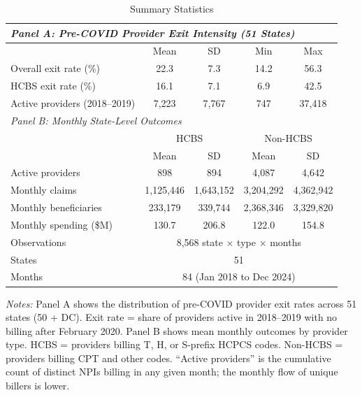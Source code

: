 \begin{table}[t]
\centering
\caption{Summary Statistics}
\label{tab:summary}
\begin{tabular}{lcccc}
\toprule
\multicolumn{5}{l}{\textit{Panel A: Pre-COVID Provider Exit Intensity (51 States)}} \\
\midrule
 & Mean & SD & Min & Max \\
Overall exit rate (\%) & 22.3 & 7.3 & 14.2 & 56.3 \\
HCBS exit rate (\%) & 16.1 & 7.1 & 6.9 & 42.5 \\
Active providers (2018--2019) & 7,223 & 7,767 & 747 & 37,418 \\
\midrule
\multicolumn{5}{l}{\textit{Panel B: Monthly State-Level Outcomes}} \\
\midrule
 & \multicolumn{2}{c}{HCBS} & \multicolumn{2}{c}{Non-HCBS} \\
 & Mean & SD & Mean & SD \\
Active providers & 898 & 894 & 4,087 & 4,642 \\
Monthly claims & 1,125,446 & 1,643,152 & 3,204,292 & 4,362,942 \\
Monthly beneficiaries & 233,179 & 339,744 & 2,368,346 & 3,329,820 \\
Monthly spending (\$M) & 130.7 & 206.8 & 122.0 & 154.8 \\
\midrule
Observations & \multicolumn{4}{c}{8,568 state $\times$ type $\times$ months} \\
States & \multicolumn{4}{c}{51} \\
Months & \multicolumn{4}{c}{84 (Jan 2018 to Dec 2024)} \\
\bottomrule
\end{tabular}
\begin{minipage}{0.95\textwidth}
\vspace{0.2cm}
\footnotesize \textit{Notes:} Panel A shows the distribution of pre-COVID provider exit rates across 51 states (50 + DC). Exit rate = share of providers active in 2018--2019 with no billing after February 2020. Panel B shows mean monthly outcomes by provider type. HCBS = providers billing T, H, or S-prefix HCPCS codes. Non-HCBS = providers billing CPT and other codes. ``Active providers'' is the cumulative count of distinct NPIs billing in any given month; the monthly flow of unique billers is lower.
\end{minipage}
\end{table}
